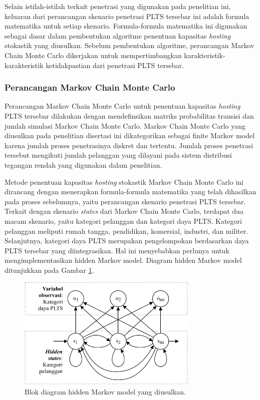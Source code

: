 Selain istilah-istilah terkait penetrasi yang digunakan pada penelitian ini, keluaran dari perancangan skenario penetrasi PLTS tersebar ini adalah formula matematika untuk setiap skenario. Formula-formula matematika ini digunakan sebagai dasar dalam pembentukan algoritme penentuan kapasitas \textit{\textit{hosting}} stokastik yang diusulkan. Sebelum pembentukan algoritme, perancangan Markov Chain Monte Carlo dikerjakan untuk mempertimbangkan karakteristik-karakteristik ketidakpastian dari penetrasi PLTS tersebar.

\subsubsection{Perancangan Markov Chain Monte Carlo}
Perancangan Markov Chain Monte Carlo untuk penentuan kapasitas \textit{\textit{hosting}} PLTS tersebar dilakukan dengan mendefinsikan matriks probabilitas transisi dan jumlah simulasi Markov Chain Monte Carlo. Markov Chain Monte Carlo yang diusulkan pada penelitian disertasi ini dikategorikan sebagai finite Markov model karena jumlah proses penetrasinya diskret dan tertentu. Jumlah proses penetrasi tersebut mengikuti jumlah pelanggan yang dilayani pada sistem distribusi tegangan rendah yang digunakan dalam penelitian.

Metode penentuan kapasitas \textit{\textit{hosting}} stokastik Markov Chain Monte Carlo ini dirancang dengan menerapkan formula-formula matematika yang telah dihasilkan pada proses sebelumnya, yaitu perancangan skenario penetrasi PLTS tersebar. Terkait dengan skenario \textit{states} dari Markov Chain Monte Carlo, terdapat dua macam skenario, yaitu kategori pelanggan dan kategori daya PLTS. Kategori pelanggan meliputi rumah tangga, pendidikan, komersial, industri, dan militer. Selanjutnya, kategori daya PLTS merupakan pengelompokan berdasarkan daya PLTS tersebar yang diintegrasikan. Hal ini menyebabkan perlunya untuk mengimplementasikan hidden Markov model. Diagram hidden Markov model ditunjukkan pada Gambar \ref{hmc}.
\begin{figure}[!h]
	\centering
	\includegraphics[width=0.77\textwidth]{Fig/hmc}
	\caption{Blok diagram hidden Markov model yang diusulkan.}
	\label{hmc}
\end{figure}

